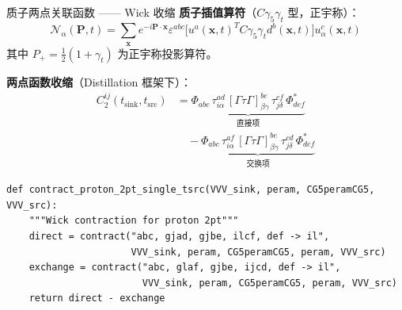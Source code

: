 \documentclass[10pt,aspectratio=169]{beamer}
\begin{document}
\begin{frame}[fragile]{质子两点关联函数 —— Wick 收缩}
\small
\textbf{质子插值算符}（$C\gamma_5\gamma_t$ 型，正宇称）：
\begin{equation}
  \mathcal{N}_\alpha(\mathbf{P}, t) = \sum_{\mathbf{x}} e^{-i\mathbf{P}\cdot\mathbf{x}}
  \varepsilon^{abc} \bigl[ u^a(\mathbf{x},t)^T C\gamma_5\gamma_t d^b(\mathbf{x},t) \bigr]
  u^c_\alpha(\mathbf{x},t)
\end{equation}
其中 $P_+ = \frac{1}{2}(1+\gamma_t)$ 为正宇称投影算符。

\textbf{两点函数收缩}（Distillation 框架下）：
\begin{align}
  C_2^{ij}(t_{\text{sink}}, t_{\text{src}}) &=
  \underbrace{\Phi_{abc}\,\tau^{ad}_{i\alpha}\,
  [\Gamma\tau\Gamma]^{be}_{\beta\gamma}\,
  \tau^{cf}_{j\delta}\,\Phi_{def}^{*}}_{\text{直接项}}
  \\
  &\quad - \underbrace{\Phi_{abc}\,\tau^{af}_{i\alpha}\,
  [\Gamma\tau\Gamma]^{be}_{\beta\gamma}\,
  \tau^{cd}_{j\delta}\,\Phi_{def}^{*}}_{\text{交换项}}
\end{align}

\begin{lstlisting}
def contract_proton_2pt_single_tsrc(VVV_sink, peram, CG5peramCG5, VVV_src):
    """Wick contraction for proton 2pt"""
    direct = contract("abc, gjad, gjbe, ilcf, def -> il",
                      VVV_sink, peram, CG5peramCG5, peram, VVV_src)
    exchange = contract("abc, glaf, gjbe, ijcd, def -> il",
                        VVV_sink, peram, CG5peramCG5, peram, VVV_src)
    return direct - exchange
\end{lstlisting}
\end{frame}
\end{document}
